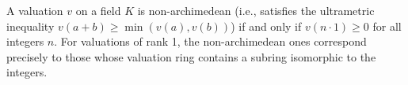 A valuation $v$ on a field $K$ is non-archimedean (i.e., satisfies the ultrametric inequality $v(a+b) \geq \min(v(a), v(b))$) if and only if $v(n \cdot 1) \geq 0$ for all integers $n$. For valuations of rank 1, the non-archimedean ones correspond precisely to those whose valuation ring contains a subring isomorphic to the integers.
